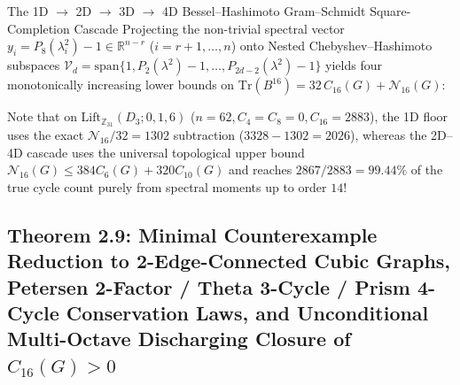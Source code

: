 \documentclass[10pt,a4paper]{article}
\theoremstyle{definition}
\theoremstyle{remark}
\begin{document}
\begin{cascadebox}{The 1D $\to$ 2D $\to$ 3D $\to$ 4D Bessel--Hashimoto Gram--Schmidt Square-Completion Cascade}
Projecting the non-trivial spectral vector $y_i = P_8(\lambda_i^2) - 1 \in \mathbb{R}^{n-r}$ ($i = r+1, \dots, n$) onto Nested Chebyshev--Hashimoto subspaces $\mathcal{V}_d = \mathrm{span}\{1, P_2(\lambda^2)-1, \dots, P_{2d-2}(\lambda^2)-1\}$ yields four monotonically increasing lower bounds on $\mathrm{Tr}(B^{16}) = 32\,C_{16}(G) + \mathcal{N}_{16}(G)$:
\begin{center}
\end{center}
Note that on $\mathrm{Lift}_{\mathbb{Z}_{31}}(D_3; 0, 1, 6)$ ($n=62, C_4=C_8=0, C_{16}=2883$), the 1D floor uses the exact $\mathcal{N}_{16}/32 = 1302$ subtraction ($3328 - 1302 = 2026$), whereas the 2D--4D cascade uses the universal topological upper bound $\mathcal{N}_{16}(G) \le 384 C_6(G) + 320 C_{10}(G)$ and reaches \textbf{$2867 / 2883 = 99.44\%$} of the true cycle count purely from spectral moments up to order $14$!
\end{cascadebox}

\subsection{Theorem 2.9: Minimal Counterexample Reduction to 2-Edge-Connected Cubic Graphs, Petersen 2-Factor / Theta 3-Cycle / Prism 4-Cycle Conservation Laws, and Unconditional Multi-Octave Discharging Closure of $C_{16}(G) > 0$}
\end{document}
